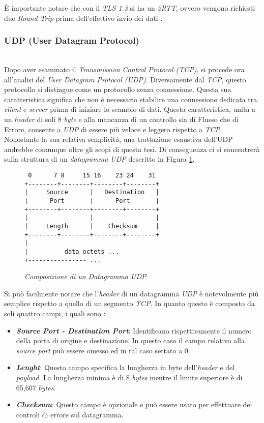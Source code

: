 \noindent È importante notare che con il \emph{TLS 1.3} si ha un \emph{2RTT}, ovvero vengono richiesti due \emph{Round Trip} prima dell'effettivo invio dei dati \cite{site:tls}. 
\subsubsection{UDP (User Datagram Protocol)}
~\\
\indent Dopo aver esaminato il \emph{Transmission Control Protocol (TCP)},
si procede ora all'analisi del \emph{User Datagram Protocol (UDP)}. 
Diversamente dal \emph{TCP}, questo protocollo si distingue come un protocollo senza connessione. 
Questa sua caratteristica significa che non è necessario stabilire una connessione dedicata tra \emph{client} e \emph{server} prima di iniziare lo scambio di dati. 
Questa caratteristica, unita a un \emph{header} di soli 8 \emph{byte} e alla mancanza di un controllo sia di Flusso che di Errore, consente a \emph{UDP} di essere più veloce e leggero rispetto a \emph{TCP}.
\\
Nonostante la sua relativa semplicità, una trattazione esaustiva dell'UDP andrebbe comunque oltre gli scopi di questa tesi. 
Di conseguenza ci si concentrerà sulla struttura di un \emph{datagramma {UDP}} descritto in Figura \ref{udp-datagram}.
\\
\begin{figure}[!h]
    \centering
    \begin{BVerbatim}
 0      7 8     15 16    23 24    31
+--------+--------+--------+--------+
|     Source      |   Destination   |
|      Port       |      Port       |
+--------+--------+--------+--------+
|                 |                 |
|     Length      |    Checksum     |
+--------+--------+--------+--------+
|
|          data octets ...
+---------------- ...
        \end{BVerbatim}
    \caption{\emph{Composizione di un Datagramma UDP}}
    \label{udp-datagram}
\end{figure}

\noindent Si può facilmente notare che l'\emph{header} di un datagramma \emph{UDP} è notevolmente più semplice rispetto a quello di un segmento \emph{TCP}.
In quanto questo è composto da soli quattro campi, i quali sono :  
\begin{itemize}
    \item \textit{\textbf{Source Port - Destination Port}}: Identificano rispettivamente il numero della porta di origine e destinazione. In questo caso il campo relativo alla \emph{source port} può essere omesso ed in tal caso settato a 0.
    \item \textit{\textbf{Lenght}}: Questo campo specifica la lunghezza in byte dell'\emph{header} e del \emph{payload}. La lunghezza minima è di 8 \emph{bytes} mentre il limite superiore è di 65,607 \emph{bytes}.
    \item \textit{\textbf{Checksum}}: Questo campo è opzionale e può essere usato per effettuare dei controli di errore sul datagramma.
\end{itemize}

